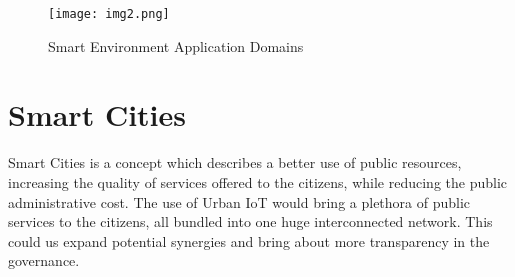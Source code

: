 \documentclass[conference]{IEEEtran}
\begin{document}
\begin{figure}[H]
\centering
\texttt{[image: img2.png]}
\caption{Smart Environment Application Domains}
\label{fig_sim}
\end{figure}

\section{Smart Cities}
Smart Cities is a concept which describes a better use of public resources, increasing the quality of services offered to the citizens, while reducing the public administrative cost. The use of Urban IoT would bring a plethora of public services to the citizens, all bundled into one huge interconnected network. This could us expand potential synergies and bring about more transparency in the governance. 
\end{document}
